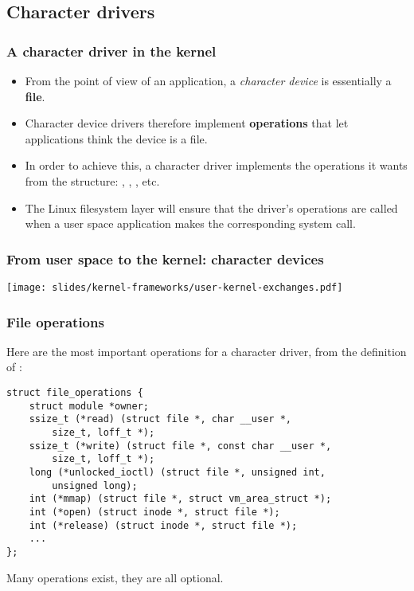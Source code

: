 \subsection{Character drivers}

\begin{frame}
  \frametitle{A character driver in the kernel}
  \begin{itemize}
  \item From the point of view of an application, a {\em character
      device} is essentially a {\bf file}.
  \item Character device drivers therefore implement {\bf operations}
    that let applications think the device is a file.
  \item In order to achieve this, a character driver implements
    the operations it wants from the 
    structure: , , , etc.
  \item The Linux filesystem layer will ensure that the driver's
    operations are called when a user space application makes the
    corresponding system call.
  \end{itemize}
\end{frame}

\begin{frame}
  \frametitle{From user space to the kernel: character devices}
  \begin{center}
    \texttt{[image: slides/kernel-frameworks/user-kernel-exchanges.pdf]}
  \end{center}
\end{frame}

\begin{frame}[fragile]
  \frametitle{File operations}
  Here are the most important operations for a character
  driver, from the definition of :
\begin{verbatim}
struct file_operations {
    struct module *owner;
    ssize_t (*read) (struct file *, char __user *,
        size_t, loff_t *);
    ssize_t (*write) (struct file *, const char __user *,
        size_t, loff_t *);
    long (*unlocked_ioctl) (struct file *, unsigned int,
        unsigned long);
    int (*mmap) (struct file *, struct vm_area_struct *);
    int (*open) (struct inode *, struct file *);
    int (*release) (struct inode *, struct file *);
    ...
};
\end{verbatim}
Many operations exist, they are all optional.
\end{frame}

